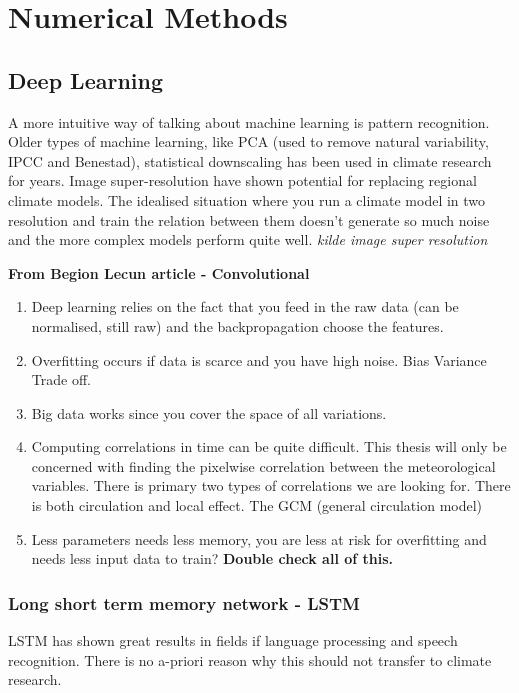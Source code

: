 \setcounter{chapter}{2}
\chapter{Numerical Methods} \label{ch:num_methods}

\section{Deep Learning}
A more intuitive way of talking about machine learning is pattern recognition. Older types of machine learning, like PCA (used to remove natural variability, IPCC and Benestad), statistical downscaling has been used in climate research for years. Image super-resolution have shown potential for replacing regional climate models. The idealised situation where you run a climate model in two resolution and train the relation between them doesn't generate so much noise and the more complex models perform quite well. \textit{kilde image super resolution}

\textbf{From Begion Lecun article - Convolutional}
\begin{enumerate}
    \item Deep learning relies on the fact that you feed in the raw data (can be normalised, still raw) and the backpropagation choose the features.
    \item Overfitting occurs if data is scarce and you have high noise. Bias Variance Trade off.
    \item Big data works since you cover the space of all variations. 
    \item Computing correlations in time can be quite difficult. This thesis will only be concerned with finding the pixelwise correlation between the meteorological variables. There is primary two types of correlations we are looking for. There is both circulation and local effect. The GCM (general circulation model)
    \item Less parameters needs  less memory, you are less at risk for overfitting and needs less input data to train? \textbf{Double check all of this.}
\end{enumerate}

\subsection{Long short term memory network - LSTM}
LSTM has shown great results in fields if language processing and speech recognition. There is no a-priori reason why this should not transfer to climate research. 


